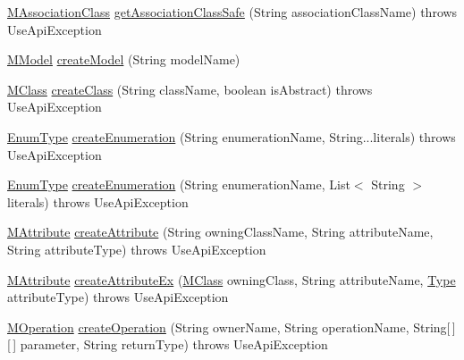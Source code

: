 \begin{DoxyCompactItemize}
\item 
\hyperlink{interfaceorg_1_1tzi_1_1use_1_1uml_1_1mm_1_1_m_association_class}{M\-Association\-Class} \hyperlink{classorg_1_1tzi_1_1use_1_1api_1_1_use_model_api_a12590322dff00967daefa666918006c8}{get\-Association\-Class\-Safe} (String association\-Class\-Name)  throws Use\-Api\-Exception 
\item 
\hyperlink{classorg_1_1tzi_1_1use_1_1uml_1_1mm_1_1_m_model}{M\-Model} \hyperlink{classorg_1_1tzi_1_1use_1_1api_1_1_use_model_api_a4e05a9a626a55fe16ace01d67932e872}{create\-Model} (String model\-Name)
\item 
\hyperlink{interfaceorg_1_1tzi_1_1use_1_1uml_1_1mm_1_1_m_class}{M\-Class} \hyperlink{classorg_1_1tzi_1_1use_1_1api_1_1_use_model_api_adcfd7321fc4d326442f30dae0c9a9123}{create\-Class} (String class\-Name, boolean is\-Abstract)  throws Use\-Api\-Exception 
\item 
\hyperlink{classorg_1_1tzi_1_1use_1_1uml_1_1ocl_1_1type_1_1_enum_type}{Enum\-Type} \hyperlink{classorg_1_1tzi_1_1use_1_1api_1_1_use_model_api_ad5e731b5781e4b26471732023e1b75b8}{create\-Enumeration} (String enumeration\-Name, String...\-literals)  throws Use\-Api\-Exception 
\item 
\hyperlink{classorg_1_1tzi_1_1use_1_1uml_1_1ocl_1_1type_1_1_enum_type}{Enum\-Type} \hyperlink{classorg_1_1tzi_1_1use_1_1api_1_1_use_model_api_aba05e926c2480af6c204065cb020cc8e}{create\-Enumeration} (String enumeration\-Name, List$<$ String $>$ literals)  throws Use\-Api\-Exception 
\item 
\hyperlink{classorg_1_1tzi_1_1use_1_1uml_1_1mm_1_1_m_attribute}{M\-Attribute} \hyperlink{classorg_1_1tzi_1_1use_1_1api_1_1_use_model_api_af19fa2689636b32bc8dc00b8e59a1836}{create\-Attribute} (String owning\-Class\-Name, String attribute\-Name, String attribute\-Type)  throws Use\-Api\-Exception 
\item 
\hyperlink{classorg_1_1tzi_1_1use_1_1uml_1_1mm_1_1_m_attribute}{M\-Attribute} \hyperlink{classorg_1_1tzi_1_1use_1_1api_1_1_use_model_api_a5f59095d773c2dc48a02cf5334299bf0}{create\-Attribute\-Ex} (\hyperlink{interfaceorg_1_1tzi_1_1use_1_1uml_1_1mm_1_1_m_class}{M\-Class} owning\-Class, String attribute\-Name, \hyperlink{interfaceorg_1_1tzi_1_1use_1_1uml_1_1ocl_1_1type_1_1_type}{Type} attribute\-Type)  throws Use\-Api\-Exception 
\item 
\hyperlink{classorg_1_1tzi_1_1use_1_1uml_1_1mm_1_1_m_operation}{M\-Operation} \hyperlink{classorg_1_1tzi_1_1use_1_1api_1_1_use_model_api_a66d5bcda001bf87374eaaa225f3a2bdc}{create\-Operation} (String owner\-Name, String operation\-Name, String\mbox{[}$\,$\mbox{]}\mbox{[}$\,$\mbox{]} parameter, String return\-Type)  throws Use\-Api\-Exception 

\end{DoxyCompactItemize}
